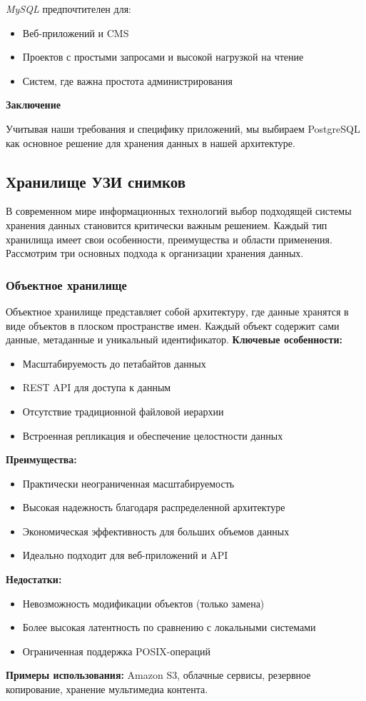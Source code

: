 \textit{MySQL} предпочтителен для:
\begin{itemize}
\item Веб-приложений и CMS
\item Проектов с простыми запросами и высокой нагрузкой на чтение
\item Систем, где важна простота администрирования
\end{itemize}

\textbf{Заключение}

Учитывая наши требования и специфику приложений, мы выбираем PostgreSQL как основное решение для хранения данных в нашей архитектуре.

\subsection{Хранилище УЗИ снимков}

В современном мире информационных технологий выбор подходящей системы хранения данных становится критически важным решением. Каждый тип хранилища имеет свои особенности, преимущества и области применения. Рассмотрим три основных подхода к организации хранения данных.
\subsubsection*{Объектное хранилище}
Объектное хранилище представляет собой архитектуру, где данные хранятся в виде объектов в плоском пространстве имен. Каждый объект содержит сами данные, метаданные и уникальный идентификатор.
\textbf{Ключевые особенности:}
\begin{itemize}
\item Масштабируемость до петабайтов данных
\item REST API для доступа к данным
\item Отсутствие традиционной файловой иерархии
\item Встроенная репликация и обеспечение целостности данных
\end{itemize}
\textbf{Преимущества:}
\begin{itemize}
\item Практически неограниченная масштабируемость
\item Высокая надежность благодаря распределенной архитектуре
\item Экономическая эффективность для больших объемов данных
\item Идеально подходит для веб-приложений и API
\end{itemize}
\textbf{Недостатки:}
\begin{itemize}
\item Невозможность модификации объектов (только замена)
\item Более высокая латентность по сравнению с локальными системами
\item Ограниченная поддержка POSIX-операций
\end{itemize}
\textbf{Примеры использования:} Amazon S3, облачные сервисы, резервное копирование, хранение мультимедиа контента.
